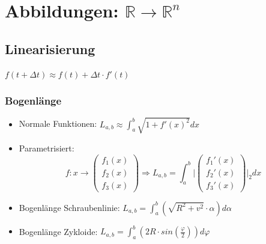 \section{Abbildungen: $\mathbb{R} \rightarrow \mathbb{R}^n$}

\subsection{Linearisierung}
$f(t+\Delta t) \approx f(t) + \Delta t \cdot f'(t)$

\subsubsection{Bogenlänge}
\begin{itemize}
	\item Normale Funktionen: $L_{a,b} \approx \int_a^b \sqrt{1+f'(x)^2} dx$
	\item Parametrisiert: \\
	\begin{displaymath}
		f: x \rightarrow
		\begin{pmatrix}
			f_1(x) \\ f_2(x) \\ f_3(x)
		\end{pmatrix}
		\Rightarrow
		L_{a,b} = \int_a^b \bigg |
		\begin{pmatrix}
			f_1'(x) \\ f_2'(x) \\ f_3'(x)
		\end{pmatrix}
		\bigg |_2 dx
	\end{displaymath}
	\item Bogenlänge Schraubenlinie:
	$L_{a,b} = \int_a^b (\sqrt{R^2 + v^2}\cdot \alpha ) d\alpha$
	\item Bogenlänge Zykloide:
	$L_{a,b} = \int_a^b (2 R\cdot sin(\frac{\varphi}{2})) d\varphi$
\end{itemize}

